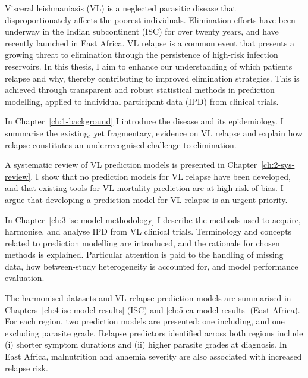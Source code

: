



Visceral leishmaniasis (VL) is a neglected parasitic disease that disproportionately affects the poorest individuals. Elimination efforts have been underway in the Indian subcontinent (ISC) for over twenty years, and have recently launched in East Africa. VL relapse is a common event that presents a growing threat to elimination through the persistence of high-risk infection reservoirs. In this thesis, I aim to enhance our understanding of which patients relapse and why, thereby contributing to improved elimination strategies. This is achieved through transparent and robust statistical methods in prediction modelling, applied to individual participant data (IPD) from clinical trials.

In Chapter~\ref{ch:1-background} I introduce the disease and its epidemiology. I summarise the existing, yet fragmentary, evidence on VL relapse and explain how relapse constitutes an underrecognised challenge to elimination.

A systematic review of VL prediction models is presented in Chapter~\ref{ch:2-sys-review}. I show that no prediction models for VL relapse have been developed, and that existing tools for VL mortality prediction are at high risk of bias. I argue that developing a prediction model for VL relapse is an urgent priority.

In Chapter~\ref{ch:3-isc-model-methodology} I describe the methods used to acquire, harmonise, and analyse IPD from VL clinical trials. Terminology and concepts related to prediction modelling are introduced, and the rationale for chosen methods is explained. Particular attention is paid to the handling of missing data, how between-study heterogeneity is accounted for, and model performance evaluation.

The harmonised datasets and VL relapse prediction models are summarised in Chapters~\ref{ch:4-isc-model-results} (ISC) and \ref{ch:5-ea-model-results} (East Africa). For each region, two prediction models are presented: one including, and one excluding parasite grade. Relapse predictors identified across both regions include (i) shorter symptom durations and (ii) higher parasite grades at diagnosis. In East Africa, malnutrition and anaemia severity are also associated with increased relapse risk.

